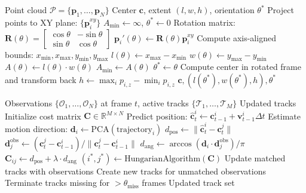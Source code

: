 \begin{algorithm}[H]
\caption{L-shape Bounding Box Fitting}
\label{alg:lshape}
\begin{algorithmic}[1]
\REQUIRE Point cloud $\mathcal{P} = \{\mathbf{p}_1, \ldots, \mathbf{p}_N\}$
\ENSURE Center $\mathbf{c}$, extent $(l, w, h)$, orientation $\theta^*$
\STATE Project points to XY plane: $\{\mathbf{p}_i^{xy}\}$
\STATE $A_{\min} \leftarrow \infty$, $\theta^* \leftarrow 0$
    \STATE Rotation matrix: $\mathbf{R}(\theta) = \begin{bmatrix} \cos\theta & -\sin\theta \\ \sin\theta & \cos\theta \end{bmatrix}$
        \STATE $\mathbf{p}_i'(\theta) \leftarrow \mathbf{R}(\theta) \mathbf{p}_i^{xy}$
    \ENDFOR
    \STATE Compute axis-aligned bounds: $x_{\min}, x_{\max}, y_{\min}, y_{\max}$
    \STATE $l(\theta) \leftarrow x_{\max} - x_{\min}$
    \STATE $w(\theta) \leftarrow y_{\max} - y_{\min}$
    \STATE $A(\theta) \leftarrow l(\theta) \cdot w(\theta)$
        \STATE $A_{\min} \leftarrow A(\theta)$
        \STATE $\theta^* \leftarrow \theta$
    \ENDIF
\ENDFOR
\STATE Compute center in rotated frame and transform back
\STATE $h \leftarrow \max_i p_{i,z} - \min_i p_{i,z}$
\RETURN $\mathbf{c}, (l(\theta^*), w(\theta^*), h), \theta^*$
\end{algorithmic}
\end{algorithm}


\begin{algorithm}[H]
\caption{Cross-Frame Vehicle Association}
\label{alg:association}
\begin{algorithmic}[1]
\REQUIRE Observations $\{\mathcal{O}_1, \ldots, \mathcal{O}_N\}$ at frame $t$, active tracks $\{\mathcal{T}_1, \ldots, \mathcal{T}_M\}$
\ENSURE Updated tracks
\STATE Initialize cost matrix $\mathbf{C} \in \mathbb{R}^{M \times N}$
    \STATE Predict position: $\hat{\mathbf{c}}_t^i \leftarrow \mathbf{c}_{t-1}^i + \mathbf{v}_{t-1}^i \Delta t$
    \STATE Estimate motion direction: $\mathbf{d}_i \leftarrow \text{PCA}(\text{trajectory}_i)$
        \STATE $d_{\text{pos}} \leftarrow \|\hat{\mathbf{c}}_t^i - \mathbf{c}_t^j\|$
        \STATE $\mathbf{d}_j^{\text{obs}} \leftarrow (\mathbf{c}_t^j - \mathbf{c}_{t-1}^i) / \|\mathbf{c}_t^j - \mathbf{c}_{t-1}^i\|$
        \STATE $d_{\text{ang}} \leftarrow \arccos(\mathbf{d}_i \cdot \mathbf{d}_j^{\text{obs}}) / \pi$
        \STATE $\mathbf{C}_{ij} \leftarrow d_{\text{pos}} + \lambda \cdot d_{\text{ang}}$
    \ENDFOR
\ENDFOR
\STATE $(i^*, j^*) \leftarrow \text{HungarianAlgorithm}(\mathbf{C})$
\STATE Update matched tracks with observations
\STATE Create new tracks for unmatched observations
\STATE Terminate tracks missing for $> \theta_{\text{miss}}$ frames
\RETURN Updated track set
\end{algorithmic}
\end{algorithm}


